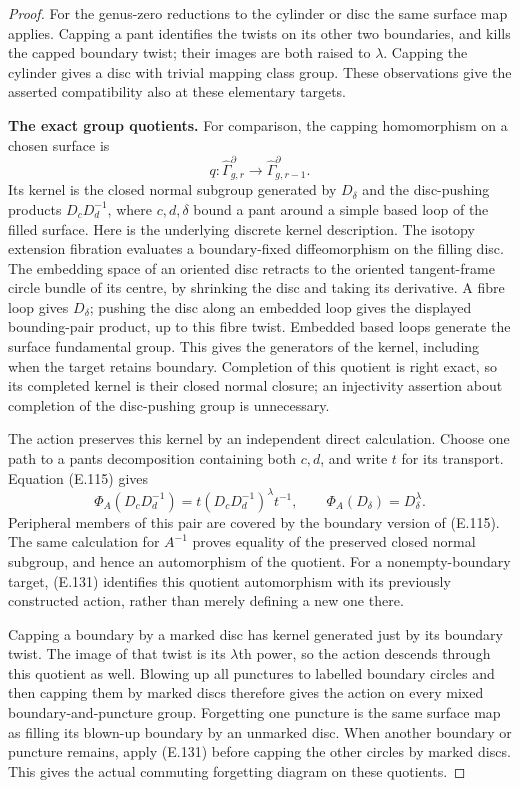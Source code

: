 \begin{proof}
For the genus-zero reductions to
the cylinder or disc the same
surface map applies.  Capping a
pant identifies the twists on
its other two boundaries, and
kills the capped boundary twist;
their images are both raised to
$\lambda$.  Capping the cylinder
gives a disc with trivial mapping
class group.  These observations
give the asserted compatibility
also at these elementary targets.

\medskip\noindent\textbf{The exact group quotients.}
For comparison, the capping
homomorphism on a chosen surface is
\[
 q:\widehat\Gamma_{g,r}^{\partial}
        \longrightarrow
        \widehat\Gamma_{g,r-1}^{\partial}.
\]
Its kernel is the closed normal
subgroup generated by $D_\delta$
and the disc-pushing products
$D_cD_d^{-1}$, where $c,d,\delta$
bound a pant around a simple
based loop of the filled surface.
Here is the underlying discrete
kernel description.  The isotopy
extension fibration evaluates a
boundary-fixed diffeomorphism on
the filling disc.  The embedding
space of an oriented disc retracts
to the oriented tangent-frame
circle bundle of its centre,
by shrinking the disc and taking
its derivative.  A fibre loop
gives $D_\delta$; pushing the
disc along an embedded loop
gives the displayed bounding-pair
product, up to this fibre twist.
Embedded based loops generate
the surface fundamental group.
This gives the generators of
the kernel, including when the
target retains boundary.
Completion of this quotient is
right exact, so its completed
kernel is their closed normal
closure; an injectivity assertion
about completion of the
disc-pushing group is unnecessary.

The action preserves this kernel
by an independent direct
calculation.  Choose one path
to a pants decomposition
containing both $c,d$, and
write $t$ for its transport.
Equation (E.115) gives
\[
 \Phi_A(D_cD_d^{-1})
     =t(D_cD_d^{-1})^\lambda t^{-1},
 \qquad
 \Phi_A(D_\delta)=D_\delta^\lambda .
                                                               \tag{E.132}
\]
Peripheral members of this pair
are covered by the boundary
version of (E.115).
The same calculation for
$A^{-1}$ proves equality of
the preserved closed normal
subgroup, and hence an
automorphism of the quotient.
For a nonempty-boundary target,
(E.131) identifies this quotient
automorphism with its previously
constructed action, rather than
merely defining a new one there.

Capping a boundary by a marked
disc has kernel generated just
by its boundary twist.  The
image of that twist is its
$\lambda$th power, so the
action descends through this
quotient as well.  Blowing up
all punctures to labelled
boundary circles and then
capping them by marked discs
therefore gives the action on
every mixed boundary-and-puncture
group.  Forgetting one puncture
is the same surface map as
filling its blown-up boundary
by an unmarked disc.
When another boundary or
puncture remains, apply
(E.131) before capping the
other circles by marked discs.
This gives the actual commuting
forgetting diagram on these
quotients.


\end{proof}
